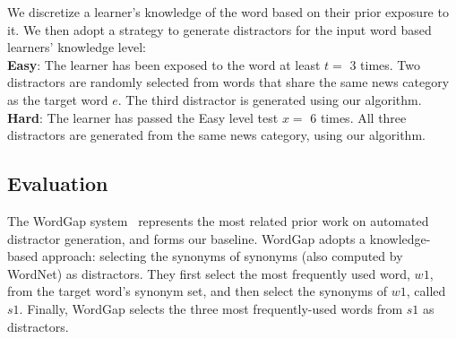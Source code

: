 
We discretize a learner's knowledge of the word based on their prior
exposure to it.  We then adopt a strategy to generate distractors for
the input word based learners' knowledge level: \\

{\bf Easy}: The learner has been exposed to the word at least $t=$ 3
times.  Two distractors are randomly selected from words that share
the same news category as the target word $e$. The third distractor is
generated using our algorithm. \\

{\bf Hard}: The learner has passed the Easy level test $x=$ 6
times.  All three distractors are generated from the same news
category, using our algorithm.


\subsection{Evaluation}

The WordGap system~\cite{Knoop2013} represents the most related prior
work on automated distractor generation, and forms our
baseline. WordGap adopts a knowledge-based approach: selecting the
synonyms of synonyms (also computed by WordNet) as distractors.  They
first select the most frequently used word, $w1$, from the target
word's synonym set, and 
then select the synonyms of $w1$, called $s1$.  Finally, WordGap
selects the three most frequently-used words from $s1$ as
distractors.

